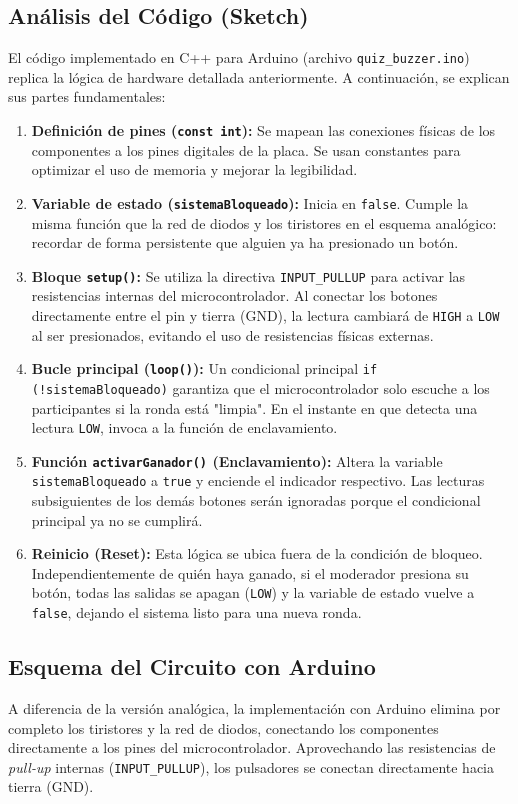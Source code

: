 \documentclass[12pt,a4paper]{article}
\begin{document}
\subsection{Análisis del Código (Sketch)}
El código implementado en C++ para Arduino (archivo \texttt{quiz\_buzzer.ino}) replica la lógica de hardware detallada anteriormente. A continuación, se explican sus partes fundamentales:

\begin{enumerate}
    \item \textbf{Definición de pines (\texttt{const int}):} Se mapean las conexiones físicas de los componentes a los pines digitales de la placa. Se usan constantes para optimizar el uso de memoria y mejorar la legibilidad.
    \item \textbf{Variable de estado (\texttt{sistemaBloqueado}):} Inicia en \texttt{false}. Cumple la misma función que la red de diodos y los tiristores en el esquema analógico: recordar de forma persistente que alguien ya ha presionado un botón.
    \item \textbf{Bloque \texttt{setup()}:} Se utiliza la directiva \texttt{INPUT\_PULLUP} para activar las resistencias internas del microcontrolador. Al conectar los botones directamente entre el pin y tierra (GND), la lectura cambiará de \texttt{HIGH} a \texttt{LOW} al ser presionados, evitando el uso de resistencias físicas externas.
    \item \textbf{Bucle principal (\texttt{loop()}):} Un condicional principal \texttt{if (!sistemaBloqueado)} garantiza que el microcontrolador solo escuche a los participantes si la ronda está "limpia". En el instante en que detecta una lectura \texttt{LOW}, invoca a la función de enclavamiento.
    \item \textbf{Función \texttt{activarGanador()} (Enclavamiento):} Altera la variable \texttt{sistemaBloqueado} a \texttt{true} y enciende el indicador respectivo. Las lecturas subsiguientes de los demás botones serán ignoradas porque el condicional principal ya no se cumplirá.
    \item \textbf{Reinicio (Reset):} Esta lógica se ubica fuera de la condición de bloqueo. Independientemente de quién haya ganado, si el moderador presiona su botón, todas las salidas se apagan (\texttt{LOW}) y la variable de estado vuelve a \texttt{false}, dejando el sistema listo para una nueva ronda.
\end{enumerate}

\subsection{Esquema del Circuito con Arduino}
A diferencia de la versión analógica, la implementación con Arduino elimina por completo los tiristores y la red de diodos, conectando los componentes directamente a los pines del microcontrolador. Aprovechando las resistencias de \textit{pull-up} internas (\texttt{INPUT\_PULLUP}), los pulsadores se conectan directamente hacia tierra (GND).
\end{document}

